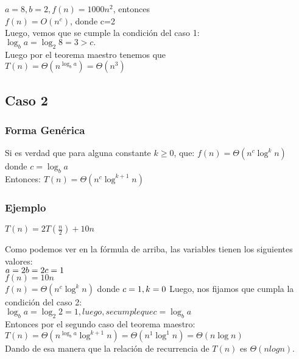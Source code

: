 \documentclass{article}
\begin{document}
        $a=8,b=2,f(n)=1000n^{2}$, entonces\\
        $f(n)=O\left(n^{c}\right)$, donde  c=2\\
        Luego, vemos que se cumple la condición del caso 1:\\

        $\log _{b}a=\log _{2}8=3>c.$\\
        Luego por el teorema maestro tenemos que\\

        $T(n)= \Theta \left(n^{\log _{b}a}\right)=\Theta \left(n^{3}\right)$
 
        \subsection{Caso 2}
        \subsubsection{Forma Genérica}
        Si es verdad que para alguna constante $k \geq  0$, que:
        $f(n)=\Theta \left(n^{c}\log ^{k}n\right)$ donde  $c=\log _{b}a$\\
        Entonces:
        $T(n)=\Theta \left(n^{c}\log ^{k+1}n\right)$
        
        \subsubsection{Ejemplo}
        $T(n)=2T\left({\frac {n}{2}}\right)+10n$

        Como podemos ver en la fórmula de arriba, las variables tienen los siguientes valores:\\
        $a=2\\ b=2\\ c=1$\\ 
        $f(n)=10n$\\
        $f(n)=\Theta \left(n^{c}\log ^{k}n\right)$
        donde  $c=1,k=0\\$
        Luego, nos fijamos que cumpla la condición del caso 2:\\
        
         $\log _{b}a=\log _{2}2=1,luego, se cumple que  c=\log _{b}a$\\
        Entonces por el segundo caso del teorema maestro:\\
        
         $T(n)=\Theta \left(n^{\log _{b}a}\log ^{k+1}n\right)=\Theta \left(n^{1}\log ^{1}n\right)=\Theta \left(n\log n\right)$\\
        Dando de esa manera que la relación de recurrencia de $T(n)$ es $\Theta(n log n).$\\
        
\end{document}

